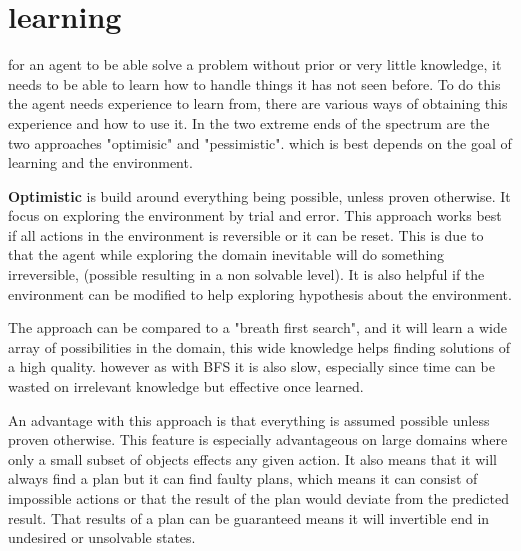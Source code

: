 \section{learning}
	for an agent to be able solve a problem without prior or very little knowledge, it needs to be able to learn how to handle things it has not seen before. To do this the agent needs experience to learn from, there are various ways of obtaining this experience and how to use it. In the two extreme ends of the spectrum are the two approaches "optimisic" and "pessimistic". which is best depends on the goal of learning and the environment.
	
	\textbf{Optimistic} is build around everything being possible, unless proven otherwise. It focus on exploring the environment by trial and error. This approach works best if all actions in the environment is reversible or it can be reset. This is due to that the agent while exploring the domain inevitable will do something irreversible, (possible resulting in a non solvable level). It is also helpful if the environment can be modified to help exploring hypothesis about the environment.
		
	The approach can be compared to a "breath first search", and it will learn a wide array of possibilities in the domain, this wide knowledge helps finding solutions of a high quality. however as with BFS it is also slow, especially since time can be wasted on irrelevant knowledge but effective once learned.


	An advantage with this approach is that everything is assumed possible unless proven otherwise. This feature is especially advantageous on large domains where only a small subset of objects effects any given action. It also means that it will always find a plan but it can find faulty plans, which means it can consist of impossible actions or that the result of the plan would deviate from the predicted result. That results of a plan can be guaranteed means it will invertible end in undesired or unsolvable states. 
				

		
		
